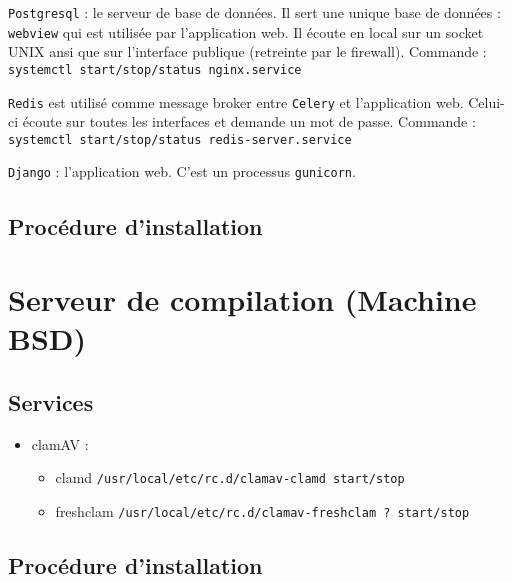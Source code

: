 \documentclass[10pt,a4paper]{article}
\begin{document}
\texttt{Postgresql} : le serveur de base de données.
Il sert une unique base de données : \texttt{webview} qui est utilisée par l'application web.
Il écoute en local sur un socket UNIX ansi que sur l'interface publique (retreinte par le firewall).
Commande : \texttt{systemctl start/stop/status nginx.service}

\texttt{Redis} est utilisé comme message broker entre \texttt{Celery} et l'application web. Celui-ci écoute sur toutes les interfaces et demande un mot de passe.
Commande : \texttt{systemctl start/stop/status redis-server.service}

\texttt{Django} : l'application web. C'est un processus \texttt{gunicorn}.


\subsection{Procédure d'installation}


\section{Serveur de compilation (Machine BSD)}
\subsection{Services}
\begin{itemize}
    \item clamAV :
        \begin{itemize}
            \item clamd \texttt{/usr/local/etc/rc.d/clamav-clamd start/stop}
            \item freshclam \texttt{/usr/local/etc/rc.d/clamav-freshclam ? start/stop}
        \end{itemize}
\end{itemize}

\subsection{Procédure d'installation}
\end{document}
